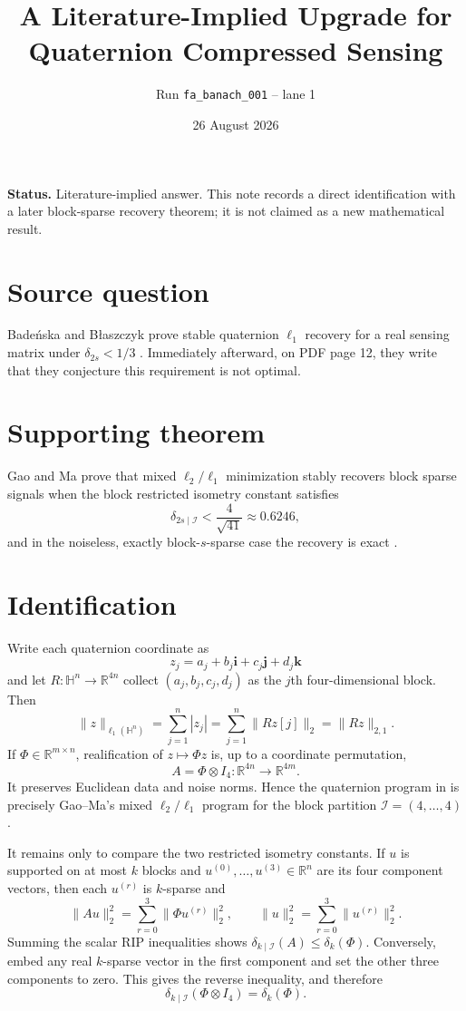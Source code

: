 \documentclass[11pt]{article}
\title{A Literature-Implied Upgrade for Quaternion Compressed Sensing}
\author{Run \texttt{fa\_banach\_001} -- lane 1}
\date{26 August 2026}
\newcommand{\HH}{\mathbb H}
\newcommand{\RR}{\mathbb R}
\newcommand{\norm}[1]{\lVert#1\rVert}
\begin{document}
\maketitle

\textbf{Status.} Literature-implied answer. This note records a direct
identification with a later block-sparse recovery theorem; it is not claimed
as a new mathematical result.

\section*{Source question}

Bade\'nska and B\l aszczyk prove stable quaternion $\ell_1$ recovery for a
real sensing matrix under $\delta_{2s}<1/3$ \cite[Theorem 4.1 and Corollary
5.1]{BB}. Immediately afterward, on PDF page 12, they write that they
conjecture this requirement is not optimal.

\section*{Supporting theorem}

Gao and Ma prove that mixed $\ell_2/\ell_1$ minimization stably recovers block
sparse signals when the block restricted isometry constant satisfies
\[
  \delta_{2s\mid\mathcal I}<\frac{4}{\sqrt{41}}\approx0.6246,
\]
and in the noiseless, exactly block-$s$-sparse case the recovery is exact
\cite[Theorem 1 and Corollary 1, PDF p.~3]{GM}.

\section*{Identification}

Write each quaternion coordinate as
\[
  z_j=a_j+b_j\mathbf i+c_j\mathbf j+d_j\mathbf k
\]
and let $R:\HH^n\to\RR^{4n}$ collect $(a_j,b_j,c_j,d_j)$ as the $j$th
four-dimensional block. Then
\[
 \norm{z}_{\ell_1(\HH^n)}
 =\sum_{j=1}^n |z_j|
 =\sum_{j=1}^n\norm{Rz[j]}_2
 =\norm{Rz}_{2,1}.
\]
If $\Phi\in\RR^{m\times n}$, realification of $z\mapsto\Phi z$ is, up to a
coordinate permutation,
\[
 A=\Phi\otimes I_4:\RR^{4n}\longrightarrow\RR^{4m}.
\]
It preserves Euclidean data and noise norms. Hence the quaternion program in
\cite{BB} is precisely Gao--Ma's mixed $\ell_2/\ell_1$ program for the block
partition $\mathcal I=(4,\ldots,4)$.

It remains only to compare the two restricted isometry constants. If $u$ is
supported on at most $k$ blocks and $u^{(0)},\ldots,u^{(3)}\in\RR^n$ are its
four component vectors, then each $u^{(r)}$ is $k$-sparse and
\[
 \norm{Au}_2^2=\sum_{r=0}^3\norm{\Phi u^{(r)}}_2^2,
 \qquad
 \norm{u}_2^2=\sum_{r=0}^3\norm{u^{(r)}}_2^2.
\]
Summing the scalar RIP inequalities shows
$\delta_{k\mid\mathcal I}(A)\leq\delta_k(\Phi)$. Conversely, embed any real
$k$-sparse vector in the first component and set the other three components to
zero. This gives the reverse inequality, and therefore
\[
 \delta_{k\mid\mathcal I}(\Phi\otimes I_4)=\delta_k(\Phi).
\]
\end{document}
